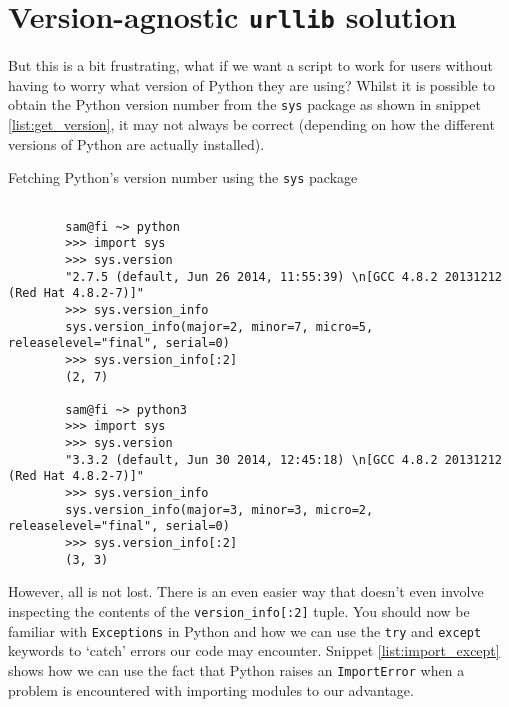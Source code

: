 \documentclass[a4paper]{article}
\begin{document}
\section*{Version-agnostic \texttt{urllib} solution}

But this is a bit frustrating, what if we want a script to work for users without
having to worry what version of Python they are using? Whilst it is possible to
obtain the Python version number from the \texttt{sys} package as shown in
snippet \ref{list:get_version}, it may not always be correct (depending on how
the different versions of Python are actually installed).

\begin{listing}[H]
    \caption[]{Fetching Python's version number using the \texttt{sys} package}
    \label{list:get_version}
    \begin{verbatim}

        sam@fi ~> python
        >>> import sys
        >>> sys.version
        "2.7.5 (default, Jun 26 2014, 11:55:39) \n[GCC 4.8.2 20131212 (Red Hat 4.8.2-7)]"
        >>> sys.version_info
        sys.version_info(major=2, minor=7, micro=5, releaselevel="final", serial=0)
        >>> sys.version_info[:2]
        (2, 7)

        sam@fi ~> python3
        >>> import sys
        >>> sys.version
        "3.3.2 (default, Jun 30 2014, 12:45:18) \n[GCC 4.8.2 20131212 (Red Hat 4.8.2-7)]"
        >>> sys.version_info
        sys.version_info(major=3, minor=3, micro=2, releaselevel="final", serial=0)
        >>> sys.version_info[:2]
        (3, 3)

    \end{verbatim}
\end{listing}

However, all is not lost. There is an even easier way that doesn't even involve
inspecting the contents of the \texttt{version\_info[:2]} tuple. You should now
be familiar with \texttt{Exceptions} in Python and how we can use the \texttt{try}
and \texttt{except} keywords to `catch' errors our code may encounter.
Snippet \ref{list:import_except} shows how we can use the fact that Python raises
an \texttt{ImportError} when a problem is encountered with importing modules to
our advantage.
\end{document}
